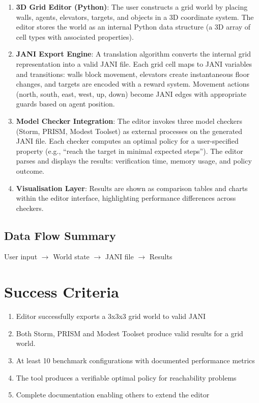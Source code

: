 \documentclass{report}
\begin{document}
\begin{enumerate}
    \item \textbf{3D Grid Editor (Python)}: The user constructs a grid world by placing walls, agents, elevators, targets, and objects in a 3D coordinate system. The editor stores the world as an internal Python data structure (a 3D array of cell types with associated properties).
    
    \item \textbf{JANI Export Engine}: A translation algorithm converts the internal grid representation into a valid JANI file. Each grid cell maps to JANI variables and transitions: walls block movement, elevators create instantaneous floor changes, and targets are encoded with a reward system. Movement actions (north, south, east, west, up, down) become JANI edges with appropriate guards based on agent position.
    
    \item \textbf{Model Checker Integration}: The editor invokes three model checkers (Storm, PRISM, Modest Toolset) as external processes on the generated JANI file. Each checker computes an optimal policy for a user-specified property (e.g., ``reach the target in minimal expected steps''). The editor parses and displays the results: verification time, memory usage, and policy outcome.
    
    \item \textbf{Visualisation Layer}: Results are shown as comparison tables and charts within the editor interface, highlighting performance differences across checkers.
\end{enumerate}

\subsection*{Data Flow Summary}

\begin{center}
User input $\rightarrow$ World state $\rightarrow$ JANI file $\rightarrow$ Results
\end{center}

\section*{Success Criteria}

\begin{enumerate}
    \item Editor successfully exports a 3x3x3 grid world to valid JANI
    \item Both Storm, PRISM and Modest Toolset produce valid results for a grid world.
    \item At least 10 benchmark configurations with documented performance metrics
    \item The tool produces a verifiable optimal policy for reachability problems
    \item Complete documentation enabling others to extend the editor
\end{enumerate}
\end{document}

